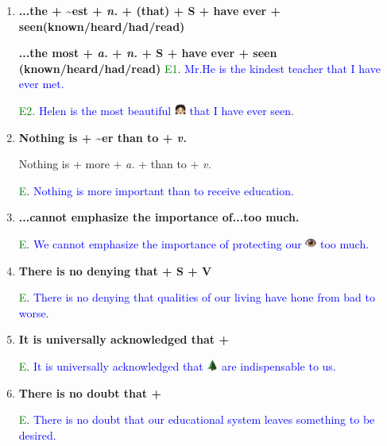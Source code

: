 \documentclass{article}
\begin{document}
\begin{enumerate}
\item \textbf{...the + \textasciitilde est + \emph{n.} + (that) + S + have ever +
  seen(known/heard/had/read)}
  
\textbf{...the most + \emph{a.} + \emph{n.} + S + have ever + seen (known/heard/had/read)}
  \textcolor{green}{E1}. \textcolor{blue} {Mr.He is the kindest teacher that I have ever
    met.}
  
  \textcolor{green}{E2}. \textcolor{blue} {Helen is the most beautiful
  }\includegraphics[height=1em]{girl} \textcolor{blue}{that I have ever seen}.

\item \textbf{Nothing is + \textasciitilde er than to + \emph{v.}}
  
  Nothing is + more + \emph{a.} + than to + \emph{v.}
  
  \textcolor{green}{E}. \textcolor{blue}{Nothing is more important than to receive
    education.}


\item \textbf{...cannot emphasize the importance of...too much.}
  
  \textcolor{green}E. \textcolor{blue}{We cannot emphasize the importance of protecting
    our } \includegraphics[height=1em]{eye} \textcolor{blue}{too much.}

\item \textbf{There is no denying that + S + V}

  \textcolor{green}E. \textcolor{blue}{There is no denying that qualities of our living have
    hone from bad to worse.}

\item \textbf{It is universally acknowledged that +}

  \textcolor{green}E. \textcolor{blue}{It is universally acknowledged that}
  \includegraphics[height=1em]{tree} \textcolor{blue}{are indispensable to us.}

\item \textbf{There is no doubt that +}

\textcolor{green}E. \textcolor{blue}{There is no doubt that our educational system leaves
  something to be desired.}


\end{enumerate}
\end{document}

